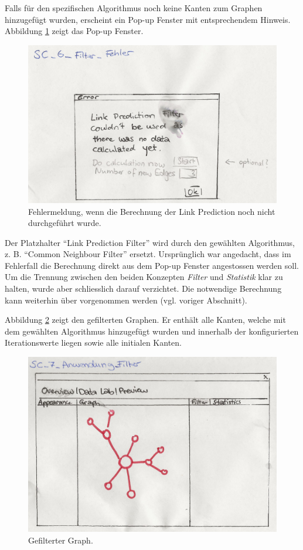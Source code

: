 Falls für den spezifischen Algorithmus noch keine Kanten zum Graphen hinzugefügt wurden, erscheint ein Pop-up Fenster mit entsprechendem Hinweis.
Abbildung \ref{fig:screen6} zeigt das Pop-up Fenster.

\begin{figure}
    \includegraphics[width=\linewidth]{resources/SC-6.png}
    \caption{Fehlermeldung, wenn die Berechnung der Link Prediction noch nicht durchgeführt wurde.}
    \label{fig:screen6}
\end{figure}

Der Platzhalter ``Link Prediction Filter'' wird durch den gewählten Algorithmus, z. B. ``Common Neighbour Filter'' ersetzt.
Ursprünglich war angedacht, dass im Fehlerfall die Berechnung direkt aus dem Pop-up Fenster angestossen werden soll.
Um die Trennung zwischen den beiden Konzepten \textit{Filter} und \textit{Statistik} klar zu halten, wurde aber schliesslich darauf verzichtet.
Die notwendige Berechnung kann weiterhin über  vorgenommen werden (vgl. voriger Abschnitt).

Abbildung \ref{fig:screen7} zeigt den gefilterten Graphen. Er enthält alle Kanten, welche mit dem gewählten Algorithmus hinzugefügt wurden und
innerhalb der konfigurierten Iterationswerte liegen sowie alle initialen Kanten.

\begin{figure}
    \includegraphics[width=\linewidth]{resources/SC-7.png}
    \caption{Gefilterter Graph.}
    \label{fig:screen7}
\end{figure}

